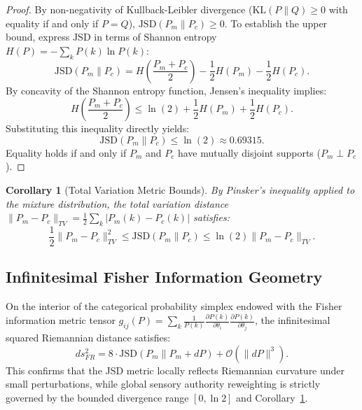 \documentclass[conference]{IEEEtran}
\newtheorem{corollary}{Corollary}
\begin{document}
\begin{proof}
By non-negativity of Kullback-Leibler divergence ($\mathrm{KL}(P \parallel Q) \ge 0$ with equality if and only if $P = Q$), $\mathrm{JSD}(P_m \parallel P_c) \ge 0$. To establish the upper bound, express $\mathrm{JSD}$ in terms of Shannon entropy $H(P) = -\sum_k P(k) \ln P(k)$:
\begin{equation}
\mathrm{JSD}(P_m \parallel P_c) = H\left(\frac{P_m + P_c}{2}\right) - \frac{1}{2} H(P_m) - \frac{1}{2} H(P_c).
\end{equation}
By concavity of the Shannon entropy function, Jensen's inequality implies:
\begin{equation}
H\left(\frac{P_m + P_c}{2}\right) \le \ln(2) + \frac{1}{2} H(P_m) + \frac{1}{2} H(P_c).
\end{equation}
Substituting this inequality directly yields:
\begin{equation}
\mathrm{JSD}(P_m \parallel P_c) \le \ln(2) \approx 0.69315.
\end{equation}
Equality holds if and only if $P_m$ and $P_c$ have mutually disjoint supports ($P_m \perp P_c$).
\end{proof}

\begin{corollary}[Total Variation Metric Bounds]
\label{cor:tv_bounds}
By Pinsker's inequality applied to the mixture distribution, the total variation distance $\|P_m - P_c\|_{TV} = \frac{1}{2}\sum_k |P_m(k) - P_c(k)|$ satisfies:
\begin{equation}
\frac{1}{2} \|P_m - P_c\|_{TV}^2 \le \mathrm{JSD}(P_m \parallel P_c) \le \ln(2) \|P_m - P_c\|_{TV}.
\end{equation}
\end{corollary}

\subsection{Infinitesimal Fisher Information Geometry}
On the interior of the categorical probability simplex endowed with the Fisher information metric tensor $g_{ij}(P) = \sum_k \frac{1}{P(k)} \frac{\partial P(k)}{\partial \theta_i} \frac{\partial P(k)}{\partial \theta_j}$, the infinitesimal squared Riemannian distance satisfies:
\begin{equation}
ds_{FR}^2 = 8 \cdot \mathrm{JSD}(P_m \parallel P_m + dP) + \mathcal{O}(\|dP\|^3).
\end{equation}
This confirms that the JSD metric locally reflects Riemannian curvature under small perturbations, while global sensory authority reweighting is strictly governed by the bounded divergence range $[0, \ln 2]$ and Corollary~\ref{cor:tv_bounds}.
\end{document}
